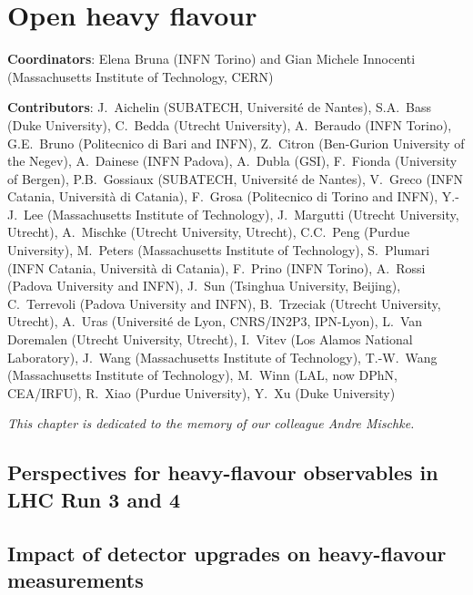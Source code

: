 \documentclass[../report.tex]{subfiles}
\providecommand{\main}{..}
\begin{document}
\clearpage
\section{Open heavy flavour}
\label{sec:HI_HF}

{ \small
\noindent 
\textbf{Coordinators}: Elena Bruna (INFN Torino) and Gian Michele Innocenti (Massachusetts Institute of Technology, CERN)

\noindent \textbf{Contributors}: 
J.~Aichelin (SUBATECH, Universit\'e de Nantes),
S.A.~Bass (Duke University),
C.~Bedda (Utrecht University),
A.~Beraudo (INFN Torino),
G.E.~Bruno (Politecnico di Bari and INFN), 
Z.~Citron (Ben-Gurion University of the Negev),
A.~Dainese (INFN Padova),
A.~Dubla (GSI),
F.~Fionda (University of Bergen),
P.B.~Gossiaux (SUBATECH, Universit\'e de Nantes),
V.~Greco (INFN Catania, Universit\`a di Catania),
F.~Grosa (Politecnico di Torino and INFN),
Y.-J.~Lee (Massachusetts Institute of Technology),
J.~Margutti (Utrecht University, Utrecht),
A.~Mischke (Utrecht University, Utrecht),
C.C.~Peng (Purdue University),
M.~Peters (Massachusetts Institute of Technology),
S.~Plumari (INFN Catania, Universit\`a di Catania),
F.~Prino (INFN Torino),
A.~Rossi (Padova University and INFN),
J.~Sun (Tsinghua University, Beijing),
C.~Terrevoli (Padova University and INFN),
B.~Trzeciak (Utrecht University, Utrecht),
A.~Uras (Universit{\'e} de Lyon, CNRS/IN2P3, IPN-Lyon),
L.~Van Doremalen (Utrecht University, Utrecht),
I.~Vitev (Los Alamos National Laboratory),
J.~Wang (Massachusetts Institute of Technology),
T.-W.~Wang (Massachusetts Institute of Technology),
M.~Winn (LAL, now DPhN, CEA/IRFU),
R.~Xiao (Purdue University),
Y.~Xu (Duke University)
}

\vspace{3mm}
\begin{center}
{\em This chapter is dedicated to the memory of our colleague Andre Mischke.}
\end{center}


\subsection{Perspectives for heavy-flavour observables in LHC Run 3 and 4}


\subsection{Impact of detector upgrades on heavy-flavour measurements}

\end{document}
